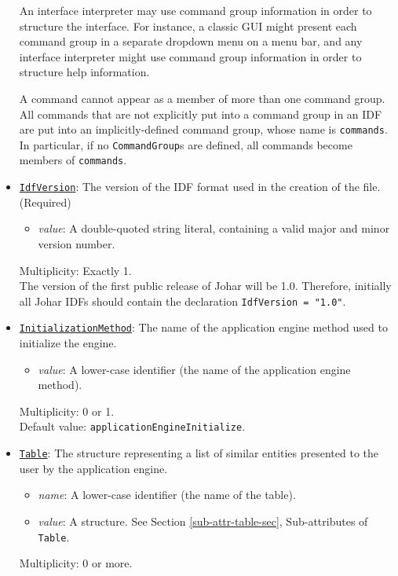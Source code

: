 \documentclass[11pt]{article}
\begin{document}
\begin{itemize}
An interface interpreter may use command group information in order
to structure the interface.  For instance, a classic GUI might
present each command group in a separate dropdown menu on a menu
bar, and any interface interpreter might use command group information
in order to structure help information.

A command cannot appear as a member of more than one command group.
All commands that are not explicitly put into a command group in
an IDF are put into an implicitly-defined command group, whose name
is {\tt commands}.  In particular, if no {\tt CommandGroup}s are
defined, all commands become members of {\tt commands}.

\item \underline{\tt IdfVersion}:  The version of the IDF format used
in the creation of the file.  (Required)
\begin{itemize}
\item {\it value}: A double-quoted string literal, containing a valid
  major and minor version number.
\end{itemize}
Multiplicity: Exactly 1. \\
The version of the first public release of Johar will be 1.0.
Therefore, initially all Johar IDFs should contain the declaration
\verb/IdfVersion = "1.0"/.

\item \underline{\tt InitializationMethod}:  The name of the
application engine method used to initialize the engine.
\begin{itemize}
\item {\it value}: A lower-case identifier (the name of the
  application engine method).
\end{itemize}
Multiplicity: 0 or 1. \\
Default value: {\tt applicationEngineInitialize}.

\item \underline{\tt Table}:  The structure representing a list of
similar entities presented to the user by the application engine.
\begin{itemize}
\item {\it name}: A lower-case identifier (the name of the table).
\item {\it value}: A structure.  See Section
  \ref{sub-attr-table-sec}, Sub-attributes of {\tt Table}.
\end{itemize}
Multiplicity: 0 or more.

\end{itemize}
\end{document}
